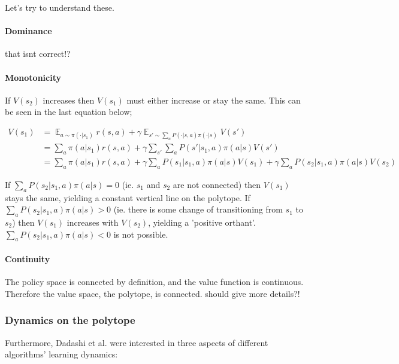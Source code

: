 Let's try to understand these.

\paragraph{Dominance} {\color{red} that isnt correct!?}

\paragraph{Monotonicity} If $V(s_2)$ increases then $V(s_1)$ must either increase or stay the same.
This can be seen in the last equation below;

\begin{align*}
V(s_1) &= \mathop{\mathbb E}_{a \sim\pi(\cdot|s_1)} r(s, a) + \gamma \mathop{\mathbb E}_{s'\sim \sum_a P(\cdot|s, a)\pi(\cdot|s)} V(s')\\
&= \sum_a \pi(a|s_1)r(s, a) + \gamma \sum_{s'}\sum_a P(s'|s_1, a)\pi(a|s) V(s') \\
&= \sum_a \pi(a|s_1)r(s, a) + \gamma \sum_a P(s_1|s_1, a)\pi(a|s) V(s_1) + \gamma\sum_a P(s_2|s_1, a)\pi(a|s) V(s_2)
\end{align*}

If $\sum_a P(s_2|s_1, a)\pi(a|s) = 0$ (ie. $s_1$ and $s_2$ are not connected)
then $V(s_1)$ stays the same, yielding a constant vertical line on the polytope.
If $\sum_a P(s_2|s_1, a)\pi(a|s) > 0$ (ie. there is some change of transitioning from $s_1$ to $s_2$)
then $V(s_1)$ increases with $V(s_2)$, yielding a 'positive orthant'.
$\sum_a P(s_2|s_1, a)\pi(a|s) < 0$ is not possible.

\paragraph{Continuity} The policy space is connected by definition, and the value function is continuous.
Therefore the value space, the polytope, is connected. {\color{red}should give more details?!}


\subsubsection{Dynamics on the polytope}

Furthermore, Dadashi et al. \cite{Dadashi2018} were interested in three aspects of different algorithms’ learning dynamics:

